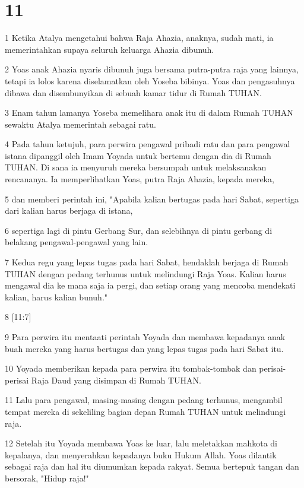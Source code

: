 \chapter{11}

\par 1 Ketika Atalya mengetahui bahwa Raja Ahazia, anaknya, sudah mati, ia memerintahkan supaya seluruh keluarga Ahazia dibunuh.
\par 2 Yoas anak Ahazia nyaris dibunuh juga bersama putra-putra raja yang lainnya, tetapi ia lolos karena diselamatkan oleh Yoseba bibinya. Yoas dan pengasuhnya dibawa dan disembunyikan di sebuah kamar tidur di Rumah TUHAN.
\par 3 Enam tahun lamanya Yoseba memelihara anak itu di dalam Rumah TUHAN sewaktu Atalya memerintah sebagai ratu.
\par 4 Pada tahun ketujuh, para perwira pengawal pribadi ratu dan para pengawal istana dipanggil oleh Imam Yoyada untuk bertemu dengan dia di Rumah TUHAN. Di sana ia menyuruh mereka bersumpah untuk melaksanakan rencananya. Ia memperlihatkan Yoas, putra Raja Ahazia, kepada mereka,
\par 5 dan memberi perintah ini, "Apabila kalian bertugas pada hari Sabat, sepertiga dari kalian harus berjaga di istana,
\par 6 sepertiga lagi di pintu Gerbang Sur, dan selebihnya di pintu gerbang di belakang pengawal-pengawal yang lain.
\par 7 Kedua regu yang lepas tugas pada hari Sabat, hendaklah berjaga di Rumah TUHAN dengan pedang terhunus untuk melindungi Raja Yoas. Kalian harus mengawal dia ke mana saja ia pergi, dan setiap orang yang mencoba mendekati kalian, harus kalian bunuh."
\par 8 [11:7]
\par 9 Para perwira itu mentaati perintah Yoyada dan membawa kepadanya anak buah mereka yang harus bertugas dan yang lepas tugas pada hari Sabat itu.
\par 10 Yoyada memberikan kepada para perwira itu tombak-tombak dan perisai-perisai Raja Daud yang disimpan di Rumah TUHAN.
\par 11 Lalu para pengawal, masing-masing dengan pedang terhunus, mengambil tempat mereka di sekeliling bagian depan Rumah TUHAN untuk melindungi raja.
\par 12 Setelah itu Yoyada membawa Yoas ke luar, lalu meletakkan mahkota di kepalanya, dan menyerahkan kepadanya buku Hukum Allah. Yoas dilantik sebagai raja dan hal itu diumumkan kepada rakyat. Semua bertepuk tangan dan bersorak, "Hidup raja!"
